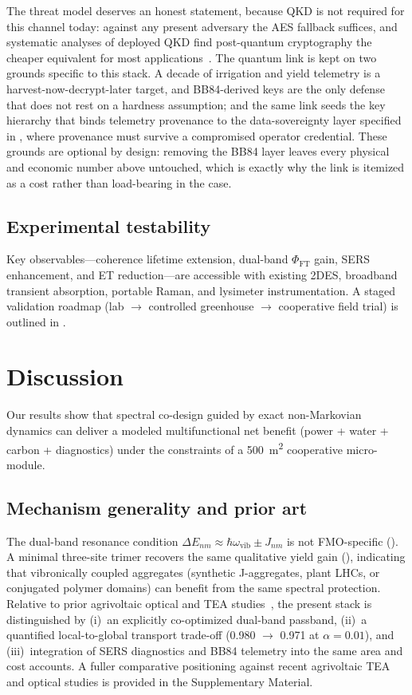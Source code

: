 \documentclass[preprint,12pt]{elsarticle}
\begin{document}
The threat model deserves an honest statement, because QKD is not required for this channel today: against any present adversary the AES fallback suffices, and systematic analyses of deployed QKD find post-quantum cryptography the cheaper equivalent for most applications~\cite{Aquina2025}. The quantum link is kept on two grounds specific to this stack. A decade of irrigation and yield telemetry is a harvest-now-decrypt-later target, and BB84-derived keys are the only defense that does not rest on a hardness assumption; and the same link seeds the key hierarchy that binds telemetry provenance to the data-sovereignty layer specified in , where provenance must survive a compromised operator credential. These grounds are optional by design: removing the BB84 layer leaves every physical and economic number above untouched, which is exactly why the link is itemized as a cost rather than load-bearing in the case.

\subsection{Experimental testability}
Key observables---coherence lifetime extension, dual-band $\Phi_{\mathrm{FT}}$ gain, SERS enhancement, and ET reduction---are accessible with existing 2DES, broadband transient absorption, portable Raman, and lysimeter instrumentation. A staged validation roadmap (lab $\to$ controlled greenhouse $\to$ cooperative field trial) is outlined in .

\section{Discussion}

Our results show that spectral co-design guided by exact non-Markovian dynamics can deliver a modeled multifunctional net benefit (power + water + carbon + diagnostics) under the constraints of a \qty{500}{\m\squared} cooperative micro-module.

\subsection{Mechanism generality and prior art}
The dual-band resonance condition $\Delta E_{nm} \approx \hbar\omega_{\mathrm{vib}} \pm J_{nm}$ is not FMO-specific (). A minimal three-site trimer recovers the same qualitative yield gain (), indicating that vibronically coupled aggregates (synthetic J-aggregates, plant LHCs, or conjugated polymer domains) can benefit from the same spectral protection. Relative to prior agrivoltaic optical and TEA studies~\cite{Valle2017,Amaducci2018,Mahim2025,Ravilla2024,Bellone2024}, the present stack is distinguished by (i)~an explicitly co-optimized dual-band passband, (ii)~a quantified local-to-global transport trade-off (\num{0.980} $\to$ \num{0.971} at $\alpha=0.01$), and (iii)~integration of SERS diagnostics and BB84 telemetry into the same area and cost accounts. A fuller comparative positioning against recent agrivoltaic TEA and optical studies is provided in the Supplementary Material.
\end{document}
